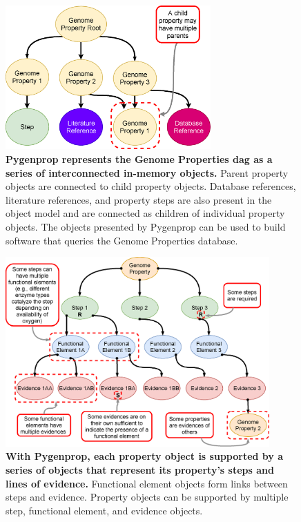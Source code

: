 \begin{figure}[!ht]
  \centering
	\includegraphics[width=0.70\textwidth]{media/Figure_1A.eps}
	 \caption[Pygenprop represents the Genome Properties DAG as a series of interconnected in-memory objects.]{\textbf{Pygenprop represents the Genome Properties \gls{dag} as a series of interconnected in-memory objects.} Parent property objects are connected to child property objects. Database references, literature references, and property steps are also present in the object model and are connected as children of individual property objects. The objects presented by Pygenprop can be used to build software that queries the Genome Properties database.}
	 \label{fig:propertytree}
\end{figure}

\begin{figure}[!ht]
  \centering
	\includegraphics[width=0.90\textwidth]{media/Figure_1B.eps}
	 \caption[With Pygenprop, each property object is supported by a series of objects that represent its property's steps and lines of evidence.]{\textbf{With Pygenprop, each property object is supported by a series of objects that represent its property's steps and lines of evidence.} Functional element objects form links between steps and evidence. Property objects can be supported by multiple step, functional element, and evidence objects.}
	 \label{fig:property}
\end{figure}

